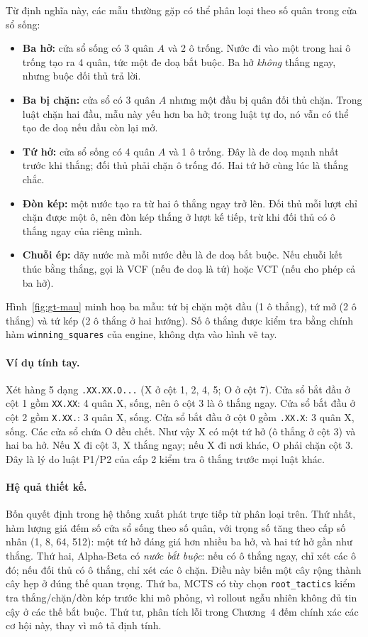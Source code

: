 Từ định nghĩa này, các mẫu thường gặp có thể phân loại theo số quân trong cửa sổ sống:
\begin{itemize}
  \item \textbf{Ba hở:} cửa sổ sống có 3 quân $A$ và 2 ô trống. Nước đi vào một trong hai ô
        trống tạo ra 4 quân, tức một đe doạ bắt buộc. Ba hở \emph{không} thắng ngay, nhưng buộc
        đối thủ trả lời.
  \item \textbf{Ba bị chặn:} cửa sổ có 3 quân $A$ nhưng một đầu bị quân đối thủ chặn. Trong
        luật chặn hai đầu, mẫu này yếu hơn ba hở; trong luật tự do, nó vẫn có thể tạo đe doạ nếu
        đầu còn lại mở.
  \item \textbf{Tứ hở:} cửa sổ sống có 4 quân $A$ và 1 ô trống. Đây là đe doạ mạnh nhất trước
        khi thắng; đối thủ phải chặn ô trống đó. Hai tứ hở cùng lúc là thắng chắc.
  \item \textbf{Đòn kép:} một nước tạo ra từ hai ô thắng ngay trở lên. Đối thủ mỗi lượt chỉ
        chặn được một ô, nên đòn kép thắng ở lượt kế tiếp, trừ khi đối thủ có ô thắng ngay của
        riêng mình.
  \item \textbf{Chuỗi ép:} dãy nước mà mỗi nước đều là đe doạ bắt buộc. Nếu chuỗi kết thúc bằng
        thắng, gọi là VCF (nếu đe doạ là tứ) hoặc VCT (nếu cho phép cả ba hở).
\end{itemize}

Hình~\ref{fig:gt-mau} minh hoạ ba mẫu: tứ bị chặn một đầu (1 ô thắng), tứ mở (2 ô thắng) và tứ
kép (2 ô thắng ở hai hướng). Số ô thắng được kiểm tra bằng chính hàm \texttt{winning\_squares}
của engine, không dựa vào hình vẽ tay.

\paragraph{Ví dụ tính tay.} Xét hàng 5 dạng \texttt{.XX.XX.O...} (X ở cột 1, 2, 4, 5; O ở cột
7). Cửa sổ bắt đầu ở cột 1 gồm \texttt{XX.XX}: 4 quân X, sống, nên ô cột 3 là ô thắng ngay.
Cửa sổ bắt đầu ở cột 2 gồm \texttt{X.XX.}: 3 quân X, sống. Cửa sổ bắt đầu ở cột 0 gồm
\texttt{.XX.X}: 3 quân X, sống. Các cửa sổ chứa O đều chết. Như vậy X có một tứ hở (ô thắng ở
cột 3) và hai ba hở. Nếu X đi cột 3, X thắng ngay; nếu X đi nơi khác, O phải chặn cột 3. Đây là
lý do luật P1/P2 của cấp 2 kiểm tra ô thắng trước mọi luật khác.

\paragraph{Hệ quả thiết kế.} Bốn quyết định trong hệ thống xuất phát trực tiếp từ phân loại
trên. Thứ nhất, hàm lượng giá đếm số cửa sổ sống theo số quân, với trọng số tăng theo cấp số
nhân (1, 8, 64, 512): một tứ hở đáng giá hơn nhiều ba hở, và hai tứ hở gần như thắng. Thứ hai,
Alpha-Beta có \emph{nước bắt buộc}: nếu có ô thắng ngay, chỉ xét các ô đó; nếu đối thủ có ô
thắng, chỉ xét các ô chặn. Điều này biến một cây rộng thành cây hẹp ở đúng thế quan trọng. Thứ
ba, MCTS có tùy chọn \texttt{root\_tactics} kiểm tra thắng/chặn/đòn kép trước khi mô phỏng, vì
rollout ngẫu nhiên không đủ tin cậy ở các thế bắt buộc. Thứ tư, phân tích lỗi trong Chương~4
đếm chính xác các cơ hội này, thay vì mô tả định tính.


